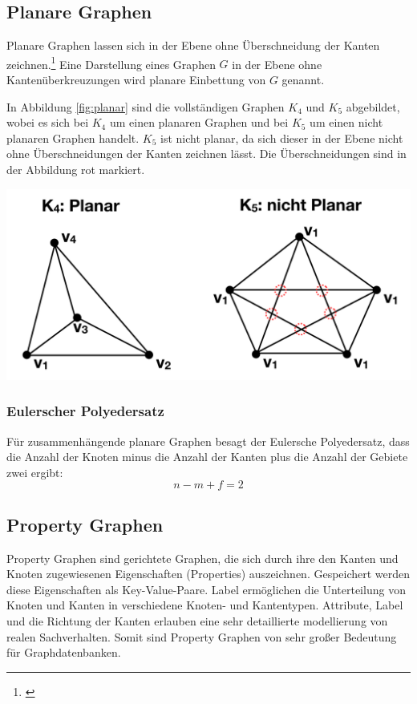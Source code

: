 \subsection{Planare Graphen}
Planare Graphen lassen sich in der Ebene ohne Überschneidung der Kanten zeichnen.\footnote{\cite{Theobald2016}}
Eine Darstellung eines Graphen $G$ in der Ebene ohne Kantenüberkreuzungen wird planare Einbettung von $G$ genannt.

In Abbildung \ref{fig:planar} sind die vollständigen Graphen $K_{4}$ und $K_{5}$ abgebildet, wobei es sich bei $K_{4}$ um einen planaren Graphen und bei $K_{5}$ um einen nicht planaren Graphen handelt.
$K_{5}$ ist nicht planar, da sich dieser in der Ebene nicht ohne Überschneidungen der Kanten zeichnen lässt.
Die Überschneidungen sind in der Abbildung rot markiert.
\begin{center}
	\includegraphics[scale = 0.5]{./images/planarer_graph.png}
	\label{fig:planar}
\end{center}
\subsubsection{Eulerscher Polyedersatz}
Für zusammenhängende planare Graphen besagt der Eulersche Polyedersatz, dass die Anzahl der Knoten minus die Anzahl der Kanten plus die Anzahl der Gebiete zwei ergibt:
\[ n - m + f = 2 \]
\subsection{Property Graphen}
Property Graphen sind gerichtete Graphen, die sich durch ihre den Kanten und Knoten zugewiesenen Eigenschaften (Properties) auszeichnen.
Gespeichert werden diese Eigenschaften als Key-Value-Paare.
Label ermöglichen die Unterteilung von Knoten und Kanten in verschiedene Knoten- und Kantentypen.
Attribute, Label und die Richtung der Kanten erlauben eine sehr detaillierte modellierung von realen Sachverhalten.
Somit sind Property Graphen von sehr großer Bedeutung für Graphdatenbanken.

